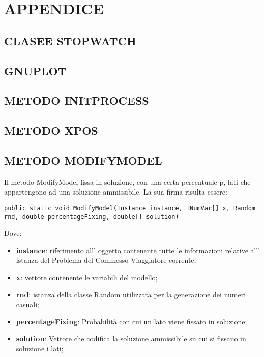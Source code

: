 \documentclass[11pt]{article}
\begin{document}
\section*{APPENDICE}
\label{sec:AppendiceS}

\subsection*{CLASEE STOPWATCH}
\label{sec:StopwatchS}

\subsection*{GNUPLOT}
\label{sec:GNUPlotS}

\subsection*{METODO INITPROCESS}
\label{sec:InitProcessS}

\subsection*{METODO XPOS}
\label{sec:XPos}

\subsection*{METODO MODIFYMODEL}
\label{sec:ModifyModelS}

Il metodo ModifyModel fissa in soluzione, con una certa percentuale p, lati che appartengono ad una soluzione ammissibile. La sua firma risulta essere:

\begin{lstlisting} 
public static void ModifyModel(Instance instance, INumVar[] x, Random rnd, double percentageFixing, double[] solution)
\end{lstlisting}

Dove:

\begin{itemize}
    \item \textbf{instance}: riferimento all' oggetto contenente tutte le informazioni relative all' istanza del Problema del Commesso Viaggiatore corrente;
    \item \textbf{x}: vettore contenente le variabili del modello;
    \item \textbf{rnd}: istanza della classe Random utilizzata per la generazione dei numeri casuali;
    \item \textbf{percentageFixing}: Probabilità con cui un lato viene fissato in soluzione;
    \item \textbf{solution}: Vettore che codifica la soluzione ammissibile su cui si fissano in soluzione i lati;
\end{itemize}
\end{document}
